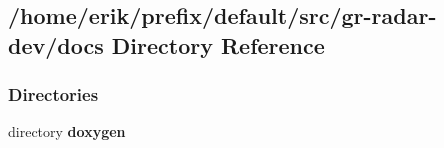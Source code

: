 \subsection{/home/erik/prefix/default/src/gr-\/radar-\/dev/docs Directory Reference}
\label{dir_1034953cafb43757c4261a4576bfb606}
\subsubsection*{Directories}
\begin{DoxyCompactItemize}
\item 
directory {\bf doxygen}
\end{DoxyCompactItemize}
